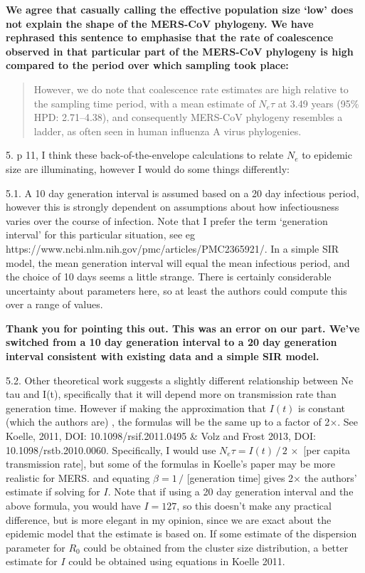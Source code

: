 \documentclass[11pt,oneside,letterpaper]{article}
\begin{document}
\textbf{We agree that casually calling the effective population size `low' does not explain the shape of the MERS-CoV phylogeny. We have rephrased this sentence to emphasise that the rate of coalescence observed in that particular part of the MERS-CoV phylogeny is high compared to the period over which sampling took place:}

\begin{quotation}
However, we do note that coalescence rate estimates are high relative to the sampling time period, with a mean estimate of $N_e\tau$ at 3.49 years (95\% HPD: 2.71--4.38), and consequently MERS-CoV phylogeny resembles a ladder, as often seen in human influenza A virus phylogenies.
\end{quotation}

5. p 11, I think these back-of-the-envelope calculations to relate $N_e$ to epidemic size are illuminating, however I would do some things differently:

5.1. A 10 day generation interval is assumed based on a 20 day infectious period, however this is strongly dependent on assumptions about how infectiousness varies over the course of infection. Note that I prefer the term `generation interval' for this particular situation, see eg https://www.ncbi.nlm.nih.gov/pmc/articles/PMC2365921/. In a simple SIR model, the mean generation interval will equal the mean infectious period, and the choice of 10 days seems a little strange. There is certainly considerable uncertainty about parameters here, so at least the authors could compute this over a range of values.

\textbf{Thank you for pointing this out. This was an error on our part. We've switched from a 10 day generation interval to a 20 day generation interval consistent with existing data and a simple SIR model.}

5.2. Other theoretical work suggests a slightly different relationship between Ne tau and I(t), specifically that it will depend more on transmission rate than generation time. However if making the approximation that $I(t)$ is constant (which the authors are) , the formulas will be the same up to a factor of 2$\times$. See Koelle, 2011, DOI: 10.1098/rsif.2011.0495 \& Volz and Frost 2013, DOI: 10.1098/rstb.2010.0060. Specifically, I would use $N_e\tau = I(t) \, / \, 2 \, \times $ [per capita transmission rate], but some of the formulas in Koelle's paper may be more realistic for MERS.
and equating $\beta = 1 \, / $ [generation time] gives 2$\times$ the authors' estimate if solving for $I$.
Note that if using a 20 day generation interval and the above formula, you would have $I = 127$, so this doesn't make any practical difference, but is more elegant in my opinion, since we are exact about the epidemic model that the estimate is based on. If some estimate of the dispersion parameter for $R_0$ could be obtained from the cluster size distribution, a better estimate for $I$ could be obtained using equations in Koelle 2011.
\end{document}
